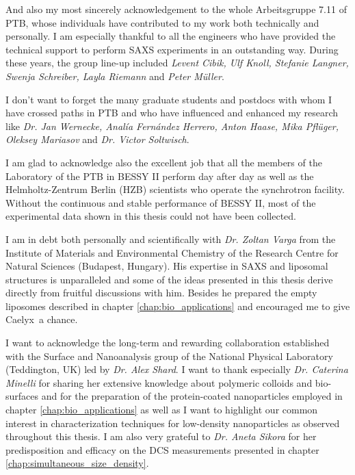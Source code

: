 \noindent And also my most sincerely acknowledgement to the whole Arbeitsgruppe 7.11 of PTB, whose individuals have contributed to my work both technically and personally. I am especially thankful to all the engineers who have provided the technical support to perform SAXS experiments in an outstanding way. During these years, the group line-up included \emph{Levent Cibik, Ulf Knoll, Stefanie Langner, Swenja Schreiber, Layla Riemann} and \emph{Peter Müller}.
\vspace{2ex}

\noindent I don't want to forget the many graduate students and postdocs with whom I have crossed paths in PTB and who have influenced and enhanced my research like \emph{Dr. Jan Wernecke, Anal\'{i}a Fern\'{a}ndez Herrero, Anton Haase, Mika Pflüger, Oleksey Mariasov} and \emph{Dr. Victor Soltwisch}.
\vspace{2ex}

\noindent I am glad to acknowledge also the excellent job that all the members of the Laboratory of the PTB in BESSY II perform day after day as well as the Helmholtz-Zentrum Berlin (HZB) scientists who operate the synchrotron facility. Without the continuous and stable performance of BESSY II, most of the experimental data shown in this thesis could not have been collected.
\vspace{2ex}

\noindent I am in debt both personally and scientifically with \emph{Dr. Zoltan Varga} from the Institute of Materials and Environmental Chemistry of the Research Centre for Natural Sciences (Budapest, Hungary). His expertise in SAXS and liposomal structures is unparalleled and some of the ideas presented in this thesis derive directly from fruitful discussions with him. Besides he prepared the empty liposomes described in chapter \ref{chap:bio_applications} and encouraged me to give Caelyx\textregistered\ a chance.

\vspace{2ex}

\noindent I want to acknowledge the long-term and rewarding collaboration established with the Surface and Nanoanalysis group of the National Physical Laboratory (Teddington, UK) led by \emph{Dr. Alex Shard}. I want to thank especially \emph{Dr. Caterina Minelli} for sharing her extensive knowledge about polymeric colloids and bio-surfaces and for the preparation of the protein-coated nanoparticles employed in chapter \ref{chap:bio_applications} as well as I want to highlight our common interest in characterization techniques for low-density nanoparticles as observed throughout this thesis. I am also very grateful to \emph{Dr. Aneta Sikora} for her predisposition and efficacy on the DCS measurements presented in chapter \ref{chap:simultaneous_size_density}.
\vspace{2ex}

